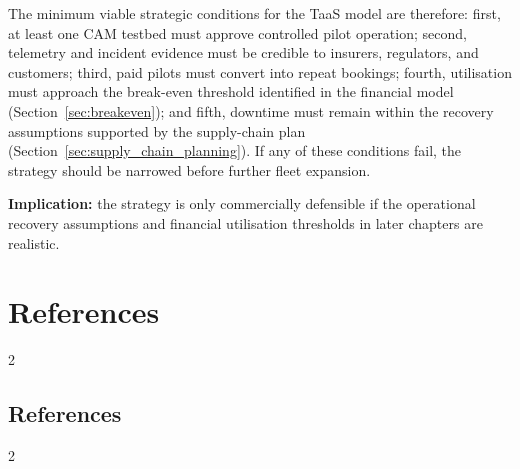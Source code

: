 \documentclass[11pt, a4paper]{report}
\numberwithin{equation}{section}
\newcommand{\compactbib}{%
  \vspace{-16pt}%
  \enlargethispage{20pt}%
  \section*{References}%
  \vspace{-33pt}%
  \begingroup
    \begin{singlespace}%
      \begin{multicols}{2}%
        \scriptsize
        \setlength{\bibitemsep}{0pt}%
        \printbibliography[heading=none]%
      \end{multicols}%
    \end{singlespace}%
  \endgroup
}
\begin{document}
\begin{refsection}
The minimum viable strategic conditions for the TaaS model are therefore: first, at least one CAM testbed must approve controlled pilot operation; second, telemetry and incident evidence must be credible to insurers, regulators, and customers; third, paid pilots must convert into repeat bookings; fourth, utilisation must approach the break-even threshold identified in the financial model (Section~\ref{sec:breakeven}); and fifth, downtime must remain within the recovery assumptions supported by the supply-chain plan (Section~\ref{sec:supply_chain_planning}). If any of these conditions fail, the strategy should be narrowed before further fleet expansion.

\noindent\textbf{Implication:} the strategy is only commercially defensible if the operational recovery assumptions and financial utilisation thresholds in later chapters are realistic.

\vspace{6pt}
\compactbib
\end{refsection}

\begin{refsection}
\graphicspath{{../MichaelZiyangXing/}}

\compactbib
\end{refsection}
\end{document}
